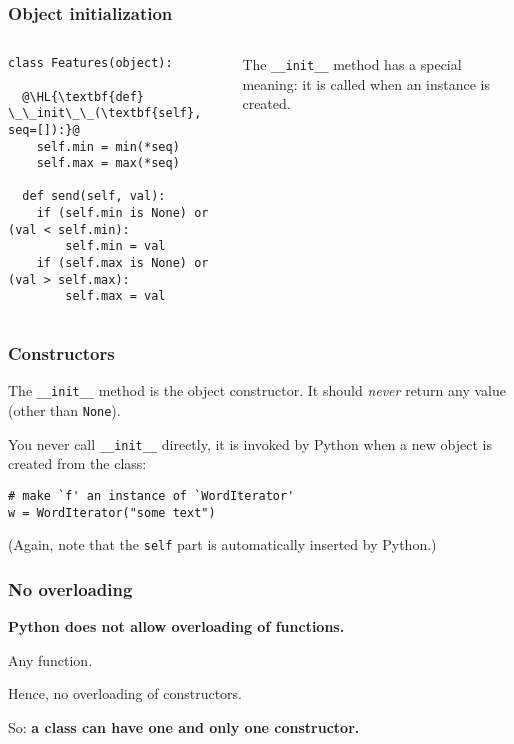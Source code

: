 \documentclass[english,serif,mathserif,xcolor=pdftex,dvipsnames,table]{beamer}
\begin{document}
\begin{frame}[fragile]
  \frametitle{Object initialization}
  \begin{columns}[t]
    \begin{column}{0.5\textwidth}
\begin{lstlisting}
class Features(object):

  @\HL{\textbf{def} \_\_init\_\_(\textbf{self}, seq=[]):}@
    self.min = min(*seq)
    self.max = max(*seq)

  def send(self, val):
    if (self.min is None) or (val < self.min):
        self.min = val
    if (self.max is None) or (val > self.max):
        self.max = val
\end{lstlisting}
    \end{column}
    \begin{column}{0.5\textwidth}
      \raggedleft
      The \lstinline|__init__| method has a special
      meaning: it is called when an instance is created.
    \end{column}
  \end{columns}
\end{frame}



\begin{frame}[fragile]
  \frametitle{Constructors}

  The \lstinline|__init__| method is the object constructor.
  It should \emph{never} return any value (other than \texttt{None}).

  \+ 
  You never call \lstinline|__init__| directly, it is invoked by
  Python when a new object is created from the class:
\begin{lstlisting}
# make `f' an instance of `WordIterator'
w = WordIterator("some text")
\end{lstlisting}

  \+
  (Again, note that the \texttt{self} part is automatically inserted
  by Python.)
\end{frame}


\begin{frame}
  \frametitle{No overloading}

  \textbf{Python does not allow overloading of functions.}

  \+
  Any function.

  \+
  Hence, no overloading of constructors.

  \+
  So: \textbf{a class can have one and only one constructor.}
\end{frame}
\end{document}
